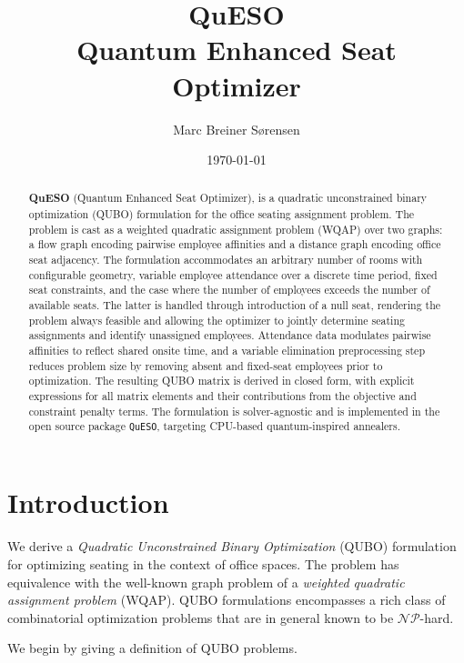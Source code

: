 \documentclass[10pt]{article}
\title{\Large\textbf{QuESO}\\Quantum Enhanced Seat Optimizer}
\author{Marc Breiner Sørensen}
\date{\normalsize\today}
\theoremstyle{definition}
\theoremstyle{plain}
\theoremstyle{remark}
\begin{document}
	\maketitle
	
	\begin{abstract}
	\noindent \textbf{QuESO} (Quantum Enhanced Seat Optimizer), is a quadratic unconstrained 
	binary optimization (QUBO) formulation for the office seating assignment problem. 
	The problem is cast as a weighted quadratic assignment problem (WQAP) over two graphs: 
	a flow graph encoding pairwise employee affinities and a distance graph encoding office 
	seat adjacency. The formulation accommodates an arbitrary number of rooms with 
	configurable geometry, variable employee attendance over a discrete time period, fixed 
	seat constraints, and the case where the number of employees exceeds the number of 
	available seats. The latter is handled through introduction of a null seat, rendering 
	the problem always feasible and allowing the optimizer to jointly determine seating 
	assignments and identify unassigned employees. Attendance data modulates pairwise 
	affinities to reflect shared onsite time, and a variable elimination preprocessing step 
	reduces problem size by removing absent and fixed-seat employees prior to optimization. 
	The resulting QUBO matrix is derived in closed form, with explicit expressions for all 
	matrix elements and their contributions from the objective and constraint penalty terms. 
	The formulation is solver-agnostic and is implemented in the open source package 
	\texttt{QuESO}, targeting CPU-based quantum-inspired annealers.
	\end{abstract}
	
	\newpage
	\tableofcontents
	\section{Introduction}
	We derive a \emph{Quadratic Unconstrained Binary Optimization} (QUBO) formulation for optimizing seating in the context of office spaces. The problem has equivalence with the well-known graph problem of a \textit{weighted quadratic assignment problem} (WQAP). QUBO formulations encompasses a rich class of combinatorial optimization problems that are in general known to be $\mathcal{NP}$-hard.
	
	We begin by giving a definition of QUBO problems. 
	
\end{document}
